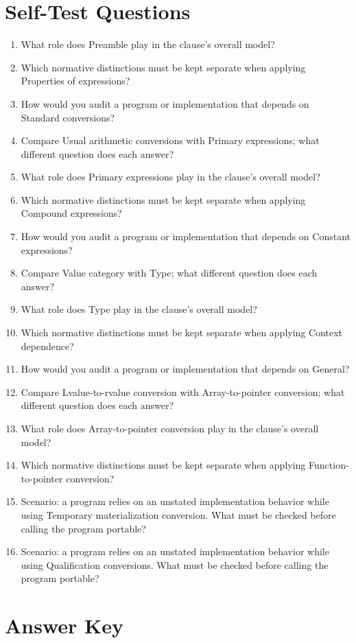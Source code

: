 \documentclass[11pt,letterpaper]{article}
\begin{document}
\section{Self-Test Questions}
\begin{enumerate}
\item What role does Preamble play in the clause's overall model?
\item Which normative distinctions must be kept separate when applying Properties of expressions?
\item How would you audit a program or implementation that depends on Standard conversions?
\item Compare Usual arithmetic conversions with Primary expressions; what different question does each answer?
\item What role does Primary expressions play in the clause's overall model?
\item Which normative distinctions must be kept separate when applying Compound expressions?
\item How would you audit a program or implementation that depends on Constant expressions?
\item Compare Value category with Type; what different question does each answer?
\item What role does Type play in the clause's overall model?
\item Which normative distinctions must be kept separate when applying Context dependence?
\item How would you audit a program or implementation that depends on General?
\item Compare Lvalue-to-rvalue conversion with Array-to-pointer conversion; what different question does each answer?
\item What role does Array-to-pointer conversion play in the clause's overall model?
\item Which normative distinctions must be kept separate when applying Function-to-pointer conversion?
\item Scenario: a program relies on an unstated implementation behavior while using Temporary materialization conversion. What must be checked before calling the program portable?
\item Scenario: a program relies on an unstated implementation behavior while using Qualification conversions. What must be checked before calling the program portable?
\end{enumerate}
\clearpage\section{Answer Key}
\end{document}
